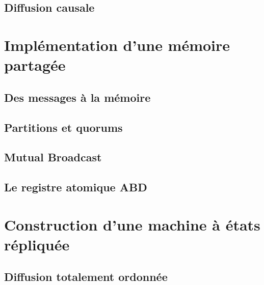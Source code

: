 \documentclass[9pt]{beamer}
\begin{document}
\subsection{Diffusion causale}



 
\section{Implémentation d'une mémoire partagée}
 
\subsection{Des messages à la mémoire}



 
\subsection{Partitions et quorums}



 
\subsection{Mutual Broadcast}




 
\subsection{Le registre atomique ABD}

 
\section{Construction d'une machine à états répliquée}
 
\subsection{Diffusion totalement ordonnée}






 
\end{document}
